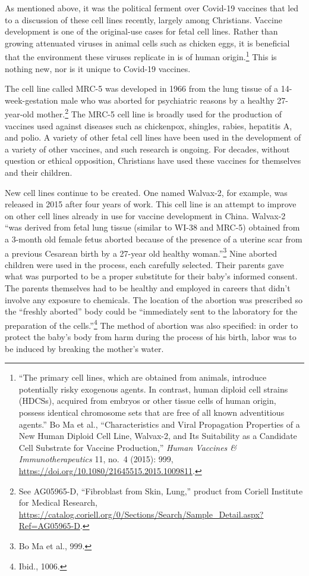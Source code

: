 \documentclass[
]{book}
\begin{document}
As mentioned above, it was the political ferment over Covid-19 vaccines that led to a discussion of these cell lines recently, largely among Christians. Vaccine development is one of the original-use cases for fetal cell lines. Rather than growing attenuated viruses in animal cells such as chicken eggs, it is beneficial that the environment these viruses replicate in is of human origin.\footnote{``The primary cell lines, which are obtained from animals, introduce potentially risky exogenous agents. In contrast, human diploid cell strains (HDCSs), acquired from embryos or other tissue cells of human origin, possess identical chromosome sets that are free of all known adventitious agents.'' Bo Ma et al., ``Characteristics and Viral Propagation Properties of a New Human Diploid Cell Line, Walvax-2, and Its Suitability as a Candidate Cell Substrate for Vaccine Production,'' \emph{Human Vaccines \& Immunotherapeutics} 11, no.~4 (2015): 999, \url{https://doi.org/10.1080/21645515.2015.1009811}.} This is nothing new, nor is it unique to Covid-19 vaccines.

The cell line called MRC-5 was developed in 1966 from the lung tissue of a 14-week-gestation male who was aborted for psychiatric reasons by a healthy 27-year-old mother.\footnote{See AG05965-D, ``Fibroblast from Skin, Lung,'' product from Coriell Institute for Medical Research, \url{https://catalog.coriell.org/0/Sections/Search/Sample_Detail.aspx?Ref=AG05965-D}.} The MRC-5 cell line is broadly used for the production of vaccines used against diseases such as chickenpox, shingles, rabies, hepatitis A, and polio. A variety of other fetal cell lines have been used in the development of a variety of other vaccines, and such research is ongoing. For decades, without question or ethical opposition, Christians have used these vaccines for themselves and their children.

New cell lines continue to be created. One named Walvax-2, for example, was released in 2015 after four years of work. This cell line is an attempt to improve on other cell lines already in use for vaccine development in China. Walvax-2 ``was derived from fetal lung tissue (similar to WI-38 and MRC-5) obtained from a 3-month old female fetus aborted because of the presence of a uterine scar from a previous Cesarean birth by a 27-year old healthy woman.''\footnote{Bo Ma et al., 999.} Nine aborted children were used in the process, each carefully selected. Their parents gave what was purported to be a proper substitute for their baby's informed consent. The parents themselves had to be healthy and employed in careers that didn't involve any exposure to chemicals. The location of the abortion was prescribed so the ``freshly aborted'' body could be ``immediately sent to the laboratory for the preparation of the cells.''\footnote{Ibid., 1006.} The method of abortion was also specified: in order to protect the baby's body from harm during the process of his birth, labor was to be induced by breaking the mother's water.
\end{document}
